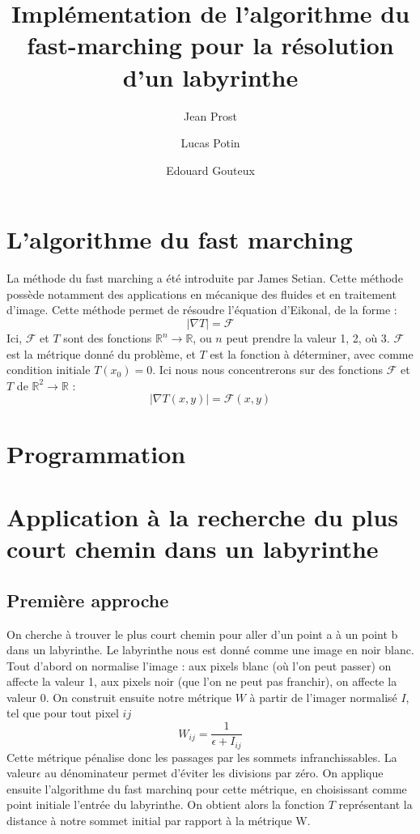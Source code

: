 \documentclass{article}
\title{Implémentation de l'algorithme du fast-marching pour la résolution d'un labyrinthe}
\author{Jean Prost \and Lucas Potin \and Edouard Gouteux}
\begin{document}
	
\maketitle
	
\section{L'algorithme du fast marching}

La méthode du fast marching a été introduite par James Setian. Cette méthode possède notamment des applications en mécanique des fluides et en traitement d'image. Cette méthode permet de résoudre l'équation d'Eikonal, de la forme :
\begin{equation}
|\nabla T|=\mathcal{F}
\end{equation}
Ici, $ \mathcal{F}$ et $T$ sont des fonctions $\mathbb{R}^n \to \mathbb{R}$, ou $n$ peut prendre la valeur 1, 2, où 3. $\mathcal{F}$ est la métrique donné du problème, et $T$ est la fonction à déterminer, avec comme condition initiale $T(x_0) = 0$. Ici nous nous concentrerons sur des fonctions $ \mathcal{F}$ et $T$ de $\mathbb{R}^2 \to \mathbb{R}$ :
\begin{equation}
|\nabla T(x,y)|=\mathcal{F}(x,y)
\end{equation}


\section{Programmation}

\section{Application à la recherche du plus court chemin dans un labyrinthe}
\subsection{Première approche}
On cherche à trouver le plus court chemin pour aller d'un point a à un point b dans un labyrinthe. Le labyrinthe nous est donné comme une image en noir blanc. Tout d'abord on normalise l'image : aux pixels blanc (où l'on peut passer) on affecte la valeur 1, aux pixels noir (que l'on ne peut pas franchir), on affecte la valeur 0. On construit ensuite notre métrique $W$ à partir de l'imager normalisé $I$, tel que pour tout pixel $ij$
\begin{equation}
W_{ij}  = \frac{1}{\epsilon+I_{ij}}
\end{equation}
Cette métrique pénalise donc les passages par les sommets infranchissables. La valeur$\epsilon$ au dénominateur permet d'éviter les divisions par zéro.
On applique ensuite l'algorithme du fast marchinq pour cette métrique, en choisissant comme point initiale l'entrée du labyrinthe. On obtient alors la fonction $T$ représentant la distance à notre sommet initial par rapport à la métrique W.
\end{document}
